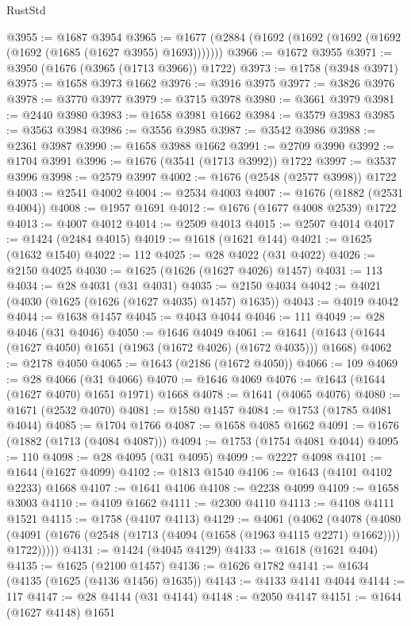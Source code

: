 \begin{lexlean}{RustStd}
\begin{coremodule}
@3955 := @1687 @3954
@3965 := @1677 (@2884 (@1692 (@1692 (@1692 (@1692 (@1692 (@1685 (@1627 @3955) @1693)))))))
@3966 := @1672 @3955
@3971 := @3950 (@1676 (@3965 (@1713 @3966)) @1722)
@3973 := @1758 (@3948 @3971)
@3975 := @1658 @3973 @1662
@3976 := @3916 @3975
@3977 := @3826 @3976
@3978 := @3770 @3977
@3979 := @3715 @3978
@3980 := @3661 @3979
@3981 := @2440 @3980
@3983 := @1658 @3981 @1662
@3984 := @3579 @3983
@3985 := @3563 @3984
@3986 := @3556 @3985
@3987 := @3542 @3986
@3988 := @2361 @3987
@3990 := @1658 @3988 @1662
@3991 := @2709 @3990
@3992 := @1704 @3991
@3996 := @1676 (@3541 (@1713 @3992)) @1722
@3997 := @3537 @3996
@3998 := @2579 @3997
@4002 := @1676 (@2548 (@2577 @3998)) @1722
@4003 := @2541 @4002
@4004 := @2534 @4003
@4007 := @1676 (@1882 (@2531 @4004))
@4008 := @1957 @1691
@4012 := @1676 (@1677 @4008 @2539) @1722
@4013 := @4007 @4012
@4014 := @2509 @4013
@4015 := @2507 @4014
@4017 := @1424 (@2484 @4015)
@4019 := @1618 (@1621 @144)
@4021 := @1625 (@1632 @1540)
@4022 := 112
@4025 := @28 @4022 (@31 @4022)
@4026 := @2150 @4025
@4030 := @1625 (@1626 (@1627 @4026) @1457)
@4031 := 113
@4034 := @28 @4031 (@31 @4031)
@4035 := @2150 @4034
@4042 := @4021 (@4030 (@1625 (@1626 (@1627 @4035) @1457) @1635))
@4043 := @4019 @4042
@4044 := @1638 @1457
@4045 := @4043 @4044
@4046 := 111
@4049 := @28 @4046 (@31 @4046)
@4050 := @1646 @4049
@4061 := @1641 (@1643 (@1644 (@1627 @4050) @1651 (@1963 (@1672 @4026) (@1672 @4035))) @1668)
@4062 := @2178 @4050
@4065 := @1643 (@2186 (@1672 @4050))
@4066 := 109
@4069 := @28 @4066 (@31 @4066)
@4070 := @1646 @4069
@4076 := @1643 (@1644 (@1627 @4070) @1651 @1971) @1668
@4078 := @1641 (@4065 @4076)
@4080 := @1671 (@2532 @4070)
@4081 := @1580 @1457
@4084 := @1753 (@1785 @4081 @4044)
@4085 := @1704 @1766
@4087 := @1658 @4085 @1662
@4091 := @1676 (@1882 (@1713 (@4084 @4087)))
@4094 := @1753 (@1754 @4081 @4044)
@4095 := 110
@4098 := @28 @4095 (@31 @4095)
@4099 := @2227 @4098
@4101 := @1644 (@1627 @4099)
@4102 := @1813 @1540
@4106 := @1643 (@4101 @4102 @2233) @1668
@4107 := @1641 @4106
@4108 := @2238 @4099
@4109 := @1658 @3003
@4110 := @4109 @1662
@4111 := @2300 @4110
@4113 := @4108 @4111 @1521
@4115 := @1758 (@4107 @4113)
@4129 := @4061
    (@4062
      (@4078
        (@4080 (@4091 (@1676 (@2548 (@1713 (@4094 (@1658 (@1963 @4115 @2271) @1662)))) @1722)))))
@4131 := @1424 (@4045 @4129)
@4133 := @1618 (@1621 @404)
@4135 := @1625 (@2100 @1457)
@4136 := @1626 @1782
@4141 := @1634 (@4135 (@1625 (@4136 @1456) @1635))
@4143 := @4133 @4141 @4044
@4144 := 117
@4147 := @28 @4144 (@31 @4144)
@4148 := @2050 @4147
@4151 := @1644 (@1627 @4148) @1651

\end{coremodule}
\end{lexlean}
